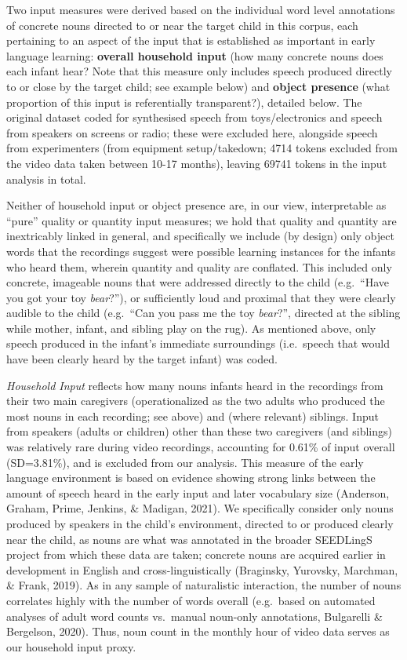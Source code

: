 \documentclass[
  man,floatsintext]{apa6}
\begin{document}
Two input measures were derived based on the individual word level annotations of concrete nouns directed to or near the target child in this corpus, each pertaining to an aspect of the input that is established as important in early language learning: \textbf{overall household input} (how many concrete nouns does each infant hear? Note that this measure only includes speech produced directly to or close by the target child; see example below) and \textbf{object presence} (what proportion of this input is referentially transparent?), detailed below. The original dataset coded for synthesised speech from toys/electronics and speech from speakers on screens or radio; these were excluded here, alongside speech from experimenters (from equipment setup/takedown; 4714 tokens excluded from the video data taken between 10-17 months), leaving 69741 tokens in the input analysis in total.

Neither of household input or object presence are, in our view, interpretable as ``pure'' quality or quantity input measures; we hold that quality and quantity are inextricably linked in general, and specifically we include (by design) only object words that the recordings suggest were possible learning instances for the infants who heard them, wherein quantity and quality are conflated. This included only concrete, imageable nouns that were addressed directly to the child (e.g.~``Have you got your toy \emph{bear}?''), or sufficiently loud and proximal that they were clearly audible to the child (e.g.~``Can you pass me the toy \emph{bear}?'', directed at the sibling while mother, infant, and sibling play on the rug). As mentioned above, only speech produced in the infant's immediate surroundings (i.e.~speech that would have been clearly heard by the target infant) was coded.

\emph{Household Input} reflects how many nouns infants heard in the recordings from their two main caregivers (operationalized as the two adults who produced the most nouns in each recording; see above) and (where relevant) siblings. Input from speakers (adults or children) other than these two caregivers (and siblings) was relatively rare during video recordings, accounting for 0.61\% of input overall (SD=3.81\%), and is excluded from our analysis. This measure of the early language environment is based on evidence showing strong links between the amount of speech heard in the early input and later vocabulary size (Anderson, Graham, Prime, Jenkins, \& Madigan, 2021). We specifically consider only nouns produced by speakers in the child's environment, directed to or produced clearly near the child, as nouns are what was annotated in the broader SEEDLingS project from which these data are taken; concrete nouns are acquired earlier in development in English and cross-linguistically (Braginsky, Yurovsky, Marchman, \& Frank, 2019). As in any sample of naturalistic interaction, the number of nouns correlates highly with the number of words overall (e.g.~based on automated analyses of adult word counts vs.~manual noun-only annotations, Bulgarelli \& Bergelson, 2020). Thus, noun count in the monthly hour of video data serves as our household input proxy.
\end{document}
